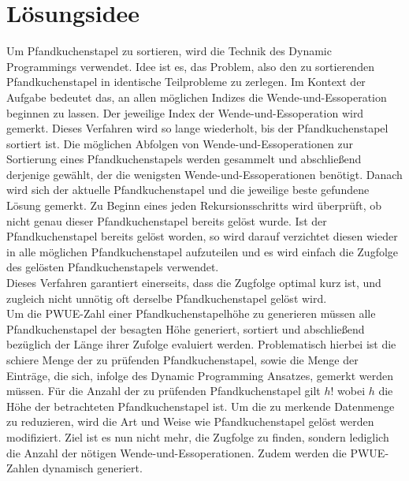 \maketitle
\tableofcontents

\vspace{0.5cm}

\section{Lösungsidee}\label{sec:losungsidee}
Um Pfandkuchenstapel zu sortieren, wird die Technik des Dynamic Programmings verwendet.
Idee ist es, das Problem, also den zu sortierenden Pfandkuchenstapel in identische Teilprobleme zu zerlegen.
Im Kontext der Aufgabe bedeutet das, an allen möglichen Indizes die Wende-und-Essoperation beginnen zu lassen.
Der jeweilige Index der Wende-und-Essoperation wird gemerkt.
Dieses Verfahren wird so lange wiederholt, bis der Pfandkuchenstapel sortiert ist.
Die möglichen Abfolgen von Wende-und-Essoperationen zur Sortierung eines Pfandkuchenstapels werden gesammelt
und abschlie{\ss}end derjenige gewählt, der die wenigsten Wende-und-Essoperationen benötigt.
Danach wird sich der aktuelle Pfandkuchenstapel und die jeweilige beste gefundene Lösung gemerkt.
Zu Beginn eines jeden Rekursionsschritts wird überprüft, ob nicht genau dieser Pfandkuchenstapel bereits gelöst wurde.
Ist der Pfandkuchenstapel bereits gelöst worden, so wird darauf verzichtet diesen wieder in alle möglichen Pfandkuchenstapel
aufzuteilen und es wird einfach die Zugfolge des gelösten Pfandkuchenstapels verwendet. \\
Dieses Verfahren garantiert einerseits, dass die Zugfolge optimal kurz ist, und zugleich nicht unnötig
oft derselbe Pfandkuchenstapel gelöst wird. \\
Um die PWUE-Zahl einer Pfandkuchenstapelhöhe zu generieren müssen alle Pfandkuchenstapel der besagten Höhe generiert,
sortiert und abschlie{\ss}end bezüglich der Länge ihrer Zufolge evaluiert werden.
Problematisch hierbei ist die schiere Menge der zu prüfenden Pfandkuchenstapel, sowie die Menge der Einträge, die sich,
infolge des Dynamic Programming Ansatzes, gemerkt werden müssen.
Für die Anzahl der zu prüfenden Pfandkuchenstapel gilt $h!$ wobei $h$ die Höhe der betrachteten Pfandkuchenstapel ist.
Um die zu merkende Datenmenge zu reduzieren, wird die Art und Weise wie Pfandkuchenstapel gelöst werden modifiziert.
Ziel ist es nun nicht mehr, die Zugfolge zu finden, sondern lediglich die Anzahl der nötigen Wende-und-Essoperationen.
Zudem werden die PWUE-Zahlen dynamisch generiert.
